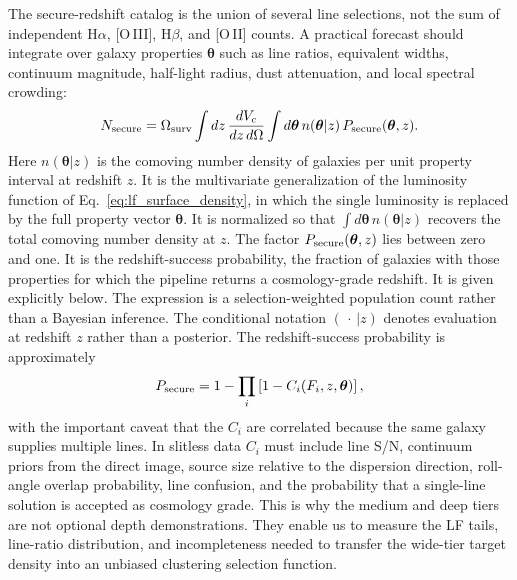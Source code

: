 \documentclass[10pt,onecolumn]{article}
\begin{document}
The secure-redshift catalog is the union of several line selections, not the sum of independent H$\alpha$, [O\,III], H$\beta$, and [O\,II] counts. A practical forecast should integrate over galaxy properties $\boldsymbol{\theta}$ such as line ratios, equivalent widths, continuum magnitude, half-light radius, dust attenuation, and local spectral crowding:
\begin{equation}
  N_{\rm secure} =
  \Omega_{\rm surv}
  \int dz\,\frac{dV_c}{dz\,d\Omega}
  \int d\boldsymbol{\theta}\,
  n(\boldsymbol{\theta}|z)\,
  P_{\rm secure}(\boldsymbol{\theta},z).
\end{equation}
Here $n(\boldsymbol{\theta}|z)$ is the comoving number density of galaxies per unit property interval at redshift $z$. It is the multivariate generalization of the luminosity function of Eq.~\eqref{eq:lf_surface_density}, in which the single luminosity is replaced by the full property vector $\boldsymbol{\theta}$. It is normalized so that $\int d\boldsymbol{\theta}\,n(\boldsymbol{\theta}|z)$ recovers the total comoving number density at $z$. The factor $P_{\rm secure}(\boldsymbol{\theta},z)$ lies between zero and one. It is the redshift-success probability, the fraction of galaxies with those properties for which the pipeline returns a cosmology-grade redshift. It is given explicitly below. The expression is a selection-weighted population count rather than a Bayesian inference. The conditional notation $(\,\cdot\,|z)$ denotes evaluation at redshift $z$ rather than a posterior. The redshift-success probability is approximately
\begin{equation}
  P_{\rm secure}=1-\prod_i
  \left[1-C_i(F_i,z,\boldsymbol{\theta})\right],
\end{equation}
with the important caveat that the $C_i$ are correlated because the same galaxy supplies multiple lines. In slitless data $C_i$ must include line S/N, continuum priors from the direct image, source size relative to the dispersion direction, roll-angle overlap probability, line confusion, and the probability that a single-line solution is accepted as cosmology grade. This is why the medium and deep tiers are not optional depth demonstrations. They enable us to measure the LF tails, line-ratio distribution, and incompleteness needed to transfer the wide-tier target density into an unbiased clustering selection function.
\end{document}
